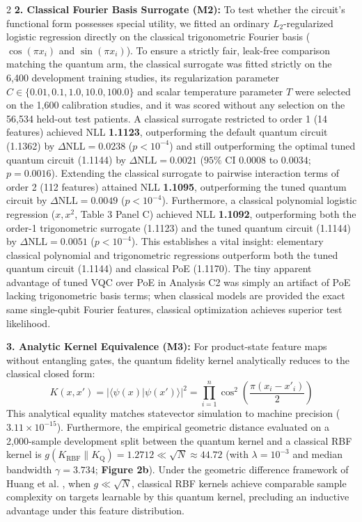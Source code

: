 \documentclass[10pt,a4paper,twoside]{article}
\begin{document}
\begin{multicols}{2}
\textbf{2. Classical Fourier Basis Surrogate (M2):} To test whether the circuit's functional form possesses special utility, we fitted an ordinary $L_2$-regularized logistic regression directly on the classical trigonometric Fourier basis ($\cos(\pi x_i)$ and $\sin(\pi x_i)$). To ensure a strictly fair, leak-free comparison matching the quantum arm, the classical surrogate was fitted strictly on the 6,400 development training studies, its regularization parameter $C \in \{0.01, 0.1, 1.0, 10.0, 100.0\}$ and scalar temperature parameter $T$ were selected on the 1,600 calibration studies, and it was scored without any selection on the 56,534 held-out test patients. A classical surrogate restricted to order 1 (14 features) achieved NLL \textbf{1.1123}, outperforming the default quantum circuit (1.1362) by $\Delta\text{NLL} = 0.0238$ ($p < 10^{-4}$) and still outperforming the optimal tuned quantum circuit (1.1144) by $\Delta\text{NLL} = \mathbf{0.0021}$ ($95\%$ CI $0.0008$ to $0.0034$; $p = 0.0016$). Extending the classical surrogate to pairwise interaction terms of order 2 (112 features) attained NLL \textbf{1.1095}, outperforming the tuned quantum circuit by $\Delta\text{NLL} = 0.0049$ ($p < 10^{-4}$). Furthermore, a classical polynomial logistic regression ($x, x^2$, Table 3 Panel C) achieved NLL \textbf{1.1092}, outperforming both the order-1 trigonometric surrogate (1.1123) and the tuned quantum circuit (1.1144) by $\Delta\text{NLL} = 0.0051$ ($p < 10^{-4}$). This establishes a vital insight: elementary classical polynomial and trigonometric regressions outperform both the tuned quantum circuit (1.1144) and classical PoE (1.1170). The tiny apparent advantage of tuned VQC over PoE in Analysis C2 was simply an artifact of PoE lacking trigonometric basis terms; when classical models are provided the exact same single-qubit Fourier features, classical optimization achieves superior test likelihood.

\textbf{3. Analytic Kernel Equivalence (M3):} For product-state feature maps without entangling gates, the quantum fidelity kernel analytically reduces to the classical closed form:
\begin{equation}
K(x, x') = |\langle \psi(x) | \psi(x') \rangle|^2 = \prod_{i=1}^n \cos^2\left(\frac{\pi(x_i - x'_i)}{2}\right)
\end{equation}
This analytical equality matches statevector simulation to machine precision ($3.11 \times 10^{-15}$). Furthermore, the empirical geometric distance \cite{huang2021power} evaluated on a 2,000-sample development split between the quantum kernel and a classical RBF kernel is $g(K_{\text{RBF}} \parallel K_{\text{Q}}) = 1.2712 \ll \sqrt{N} \approx 44.72$ (with $\lambda = 10^{-3}$ and median bandwidth $\gamma = 3.734$; \textbf{Figure 2b}). Under the geometric difference framework of Huang et al. \cite{huang2021power}, when $g \ll \sqrt{N}$, classical RBF kernels achieve comparable sample complexity on targets learnable by this quantum kernel, precluding an inductive advantage under this feature distribution.


\end{multicols}
\end{document}
